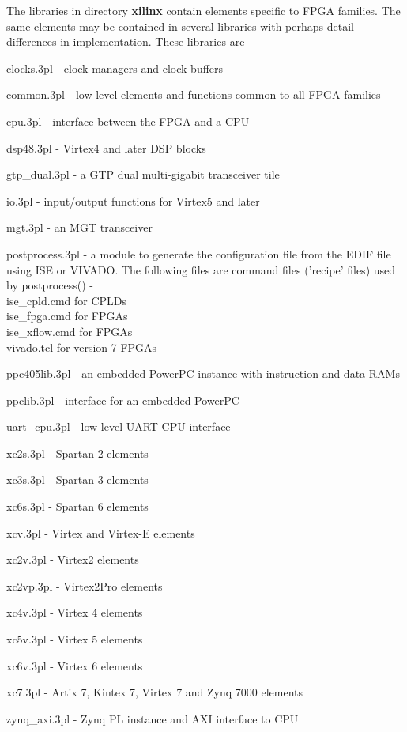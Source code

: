     The libraries in directory {\bf xilinx} contain elements specific to
    FPGA families. The same elements may be contained in several libraries
    with perhaps detail differences in implementation. These libraries are -
    \blist
    \item   clocks.3pl - clock managers and clock buffers
    \item   common.3pl - low-level elements and functions common to all FPGA
            families
    \item   cpu.3pl - interface between the FPGA and a CPU
    \item   dsp48.3pl - Virtex4 and later DSP blocks
    \item   gtp\_dual.3pl - a GTP dual multi-gigabit transceiver tile
    \item   io.3pl - input/output functions for Virtex5 and later
    \item   mgt.3pl - an MGT transceiver
    \item   postprocess.3pl - a module to generate the configuration file from
            the EDIF file using ISE or VIVADO.
            The following files are command files ('recipe' files) used by
            postprocess() -\\
            \hspace{1cm}ise\_cpld.cmd for CPLDs\\
            \hspace{1cm}ise\_fpga.cmd for FPGAs\\
            \hspace{1cm}ise\_xflow.cmd for FPGAs\\
            \hspace{1cm}vivado.tcl for version 7 FPGAs
    \item   ppc405lib.3pl - an embedded PowerPC instance with instruction and data RAMs
    \item   ppclib.3pl - interface for an embedded PowerPC
    \item   uart\_cpu.3pl - low level UART CPU interface 
    \item   xc2s.3pl - Spartan 2 elements
    \item   xc3s.3pl - Spartan 3 elements
    \item   xc6s.3pl - Spartan 6 elements
    \item   xcv.3pl - Virtex and Virtex-E elements
    \item   xc2v.3pl - Virtex2 elements
    \item   xc2vp.3pl - Virtex2Pro elements
    \item   xc4v.3pl - Virtex 4 elements
    \item   xc5v.3pl - Virtex 5 elements
    \item   xc6v.3pl - Virtex 6 elements
    \item   xc7.3pl - Artix 7, Kintex 7, Virtex 7 and Zynq 7000 elements
    \item   zynq\_axi.3pl - Zynq PL instance and AXI interface to CPU
    \blend
    





